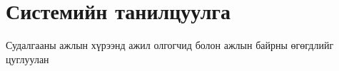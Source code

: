 \section{Системийн танилцуулга}
	\quad \quad	Судалгааны ажлын хүрээнд ажил олгогчид болон ажлын байрны өгөгдлийг цуглуулан 
